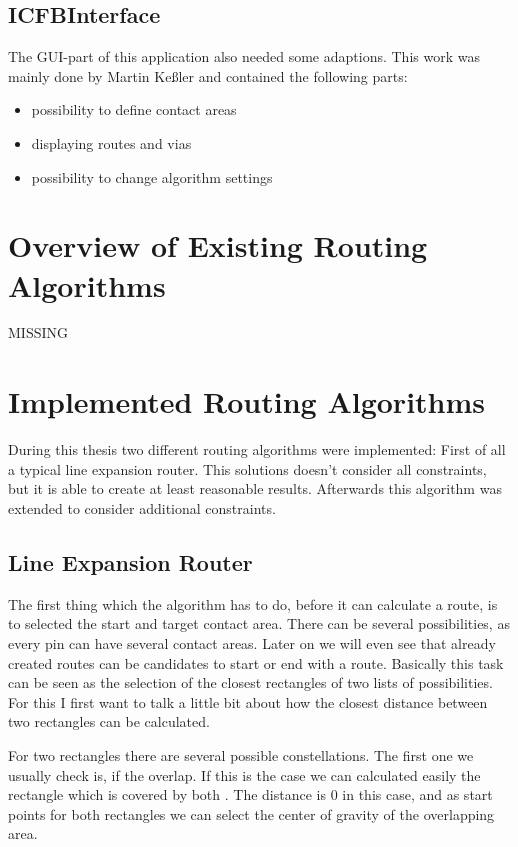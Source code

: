 \subsection{ICFBInterface}
The GUI-part of this application also needed some adaptions. This work was mainly done by Martin Keßler and contained the following parts:

\begin{itemize}
\item possibility to define contact areas
\item displaying routes and vias
\item possibility to change algorithm settings
\end{itemize}	

\section{Overview of Existing Routing Algorithms}

MISSING

\section{Implemented Routing Algorithms}
During this thesis two different routing algorithms were implemented: First of all a typical line expansion router. This solutions doesn't consider all constraints, but it is able to create at least reasonable results. Afterwards this algorithm was extended to consider additional constraints.

\subsection{Line Expansion Router}
The first thing which the algorithm has to do, before it can calculate a route, is to selected the start and target contact area. There can be several possibilities, as every pin can have several contact areas. Later on we will even see that already created routes can be candidates to start or end with a route. Basically this task can be seen as the selection of the closest rectangles of two lists of possibilities. For this I first want to talk a little bit about how the closest distance between two rectangles can be calculated.

For two rectangles there are several possible constellations. The first one we usually check is, if the overlap. If this is the case we can calculated easily the rectangle which is covered by both . The distance is 0 in this case, and as start points for both rectangles we can select the center of gravity of the overlapping area.

